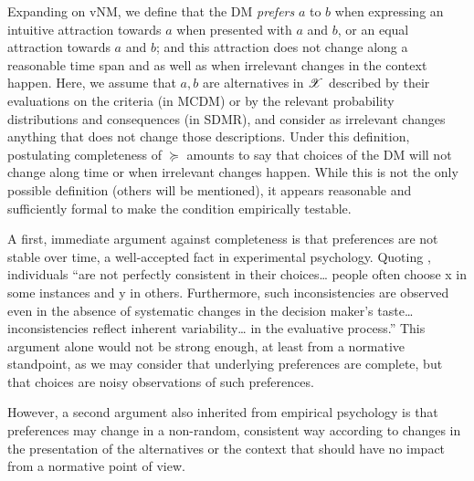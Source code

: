 \documentclass[french, english]{llncs}
\begin{document}
	Expanding on vNM, we define that the \ac{DM} \emph{prefers} $a$ to $b$ when expressing an intuitive attraction towards $a$ when presented with $a$ and $b$, or an equal attraction towards $a$ and $b$; and this attraction does not change along a reasonable time span and as well as when irrelevant changes in the context happen. %
	Here, we assume that $a, b$ are alternatives in $\mathscr{X}$ described by their evaluations on the criteria (in MCDM) or by the relevant probability distributions and consequences (in SDMR), and consider as irrelevant changes anything that does not change those descriptions. 
	Under this definition, postulating completeness of $\succeq$ amounts to say that choices of the \ac{DM} will not change along time or when irrelevant changes happen. While this is not the only possible definition (others will be mentioned), it appears reasonable and sufficiently formal to make the condition empirically testable.
	
	A first, immediate argument against completeness is that preferences are not stable over time, a well-accepted fact in experimental psychology. Quoting \citet{tversky_intransitivity_1969}, individuals “are not perfectly consistent in their choices\ldots%
	people often choose x in some instances and y in others. Furthermore, such inconsistencies are observed even in the absence of systematic changes in the decision maker’s taste\ldots %
	inconsistencies reflect inherent variability\ldots %
	in the evaluative process.” This argument alone would not be strong enough, at least from a normative standpoint, as we may consider that underlying preferences are complete, but that choices are noisy observations of such preferences. 
	
	However, a second argument also inherited from empirical psychology is that preferences may change in a non-random, consistent way according to changes in the presentation of the alternatives or the context that should have no impact from a normative point of view. 
	
	
\end{document}
